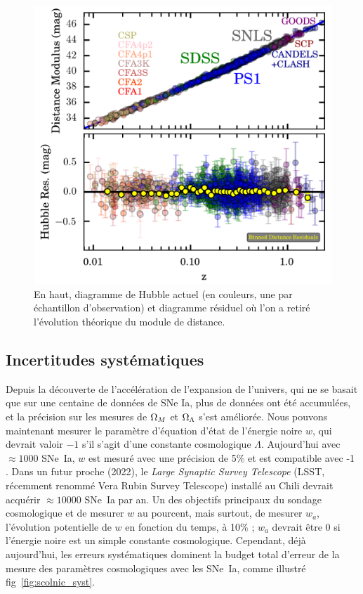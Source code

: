 \documentclass[a4paper, 12pt, svgnames]{article}
\begin{document}
\begin{figure}[htbp!]
    \centering
    \includegraphics[width=.5\linewidth]{Rapport_figures/hub_current.png}
    \captionsetup{justification=centering}
    \caption{En haut, diagramme de Hubble actuel (en couleurs, une par
             échantillon d'observation) et diagramme résiduel où l'on a retiré
             l'évolution théorique du module de distance.
             \cite{scolnic_complete_2018}}
    \label{fig:hub_current}
\end{figure}

\subsection{Incertitudes systématiques}\label{ssec:syst}

Depuis la découverte de l'accélération de l'expansion de l'univers, qui ne se
basait que sur une centaine de données de SNe Ia, plus de données ont été
accumulées, et la précision sur les mesures de $\Omega_M$ et $\Omega_\Lambda$ s'est
améliorée. Nous pouvons maintenant mesurer le paramètre d'équation d'état de
l'énergie noire $w$, qui devrait valoir $-1$ s'il s'agit d'une constante
cosmologique $\Lambda$. Aujourd'hui avec $\approx1000$ SNe~Ia, $w$ est mesuré
avec une précision de 5\% et est compatible avec -1 \cite{betoule_improved_2014,
scolnic_complete_2018}. Dans un futur proche (2022), le \textit{Large Synaptic
Survey Telescope} (LSST, récemment renommé Vera Rubin Survey Telescope) installé
au Chili devrait acquérir $\approx 10000$ SNe~Ia par an. Un des objectifs
principaux du sondage cosmologique et de mesurer $w$ au pourcent, mais surtout,
de mesurer $w_a$, l'évolution potentielle de $w$ en fonction du temps, à 10\% ;
$w_a$ devrait être 0 si l'énergie noire est un simple constante cosmologique.
Cependant, déjà aujourd'hui, les erreurs systématiques dominent la budget total
d'erreur de la mesure des paramètres cosmologiques avec les SNe~Ia, comme
illustré fig~\ref{fig:scolnic_syst}.
\end{document}
